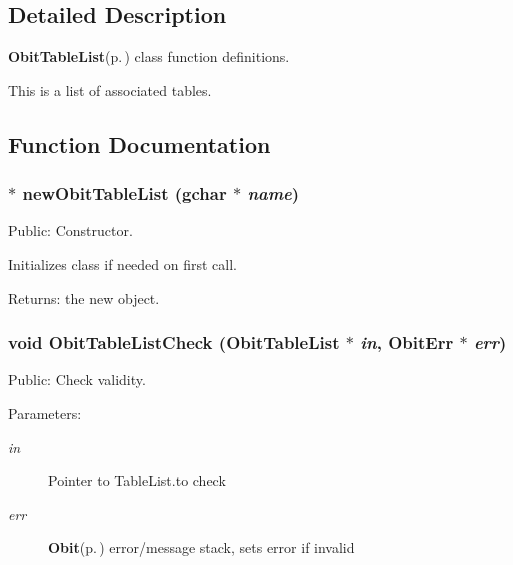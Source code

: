 \subsection{Detailed Description}
{\bf Obit\-Table\-List}{\rm (p.\,\pageref{structObitTableList})} class function definitions. 

This is a list of associated tables.

\subsection{Function Documentation}
\subsubsection{$\ast$ new\-Obit\-Table\-List (gchar $\ast$ {\em name})}\label{ObitTableList_8c_a10}


Public: Constructor. 

Initializes class if needed on first call. \begin{Desc}
\item[Returns:]the new object. \end{Desc}
\subsubsection{\setlength{\rightskip}{0pt plus 5cm}void Obit\-Table\-List\-Check ({\bf Obit\-Table\-List} $\ast$ {\em in}, {\bf Obit\-Err} $\ast$ {\em err})}\label{ObitTableList_8c_a19}


Public: Check validity. 

\begin{Desc}
\item[Parameters:]
\begin{description}
\item[{\em in}]Pointer to Table\-List.to check \item[{\em err}]{\bf Obit}{\rm (p.\,\pageref{structObit})} error/message stack, sets error if invalid \end{description}
\end{Desc}
